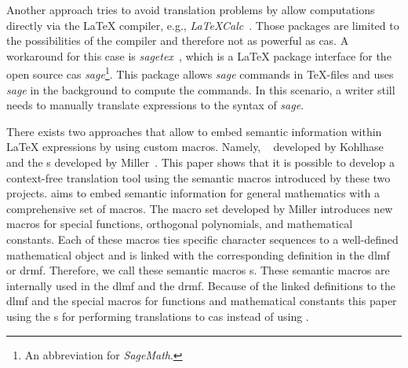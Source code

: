 
Another approach tries to avoid translation problems by allow computations directly via the \LaTeX{} compiler, e.g., \textit{LaTeXCalc}~\parencite{LatexCalc}. Those packages are limited to the possibilities of the compiler and therefore not as powerful as \gls*{cas}. A workaround for this case is \textit{sagetex}~\parencite{Sagetex}, which is a \LaTeX{} package interface for the open source \gls*{cas} \textit{sage}\footnote{An abbreviation for \textit{SageMath}.}. This package allows \textit{sage} commands in \TeX{-}files and uses \textit{sage} in the background to compute the commands. In this scenario, a writer still needs to manually translate expressions to the syntax of \textit{sage}.



There exists two approaches that allow to embed semantic information within \LaTeX{} expressions by using custom macros. Namely, \sTeX{}~\parencite{sTeX} developed by Kohlhase and the \Macro s developed by Miller~\parencite{DLMF:Macros}. This paper shows that it is possible to develop a context-free translation tool using the semantic macros introduced by these two projects. \sTeX{} aims to embed semantic information for general mathematics with a comprehensive set of macros. The macro set developed by Miller introduces new macros for special functions, orthogonal polynomials, and mathematical constants. Each of these macros ties specific character sequences to a well-defined mathematical object and is linked with the corresponding definition in the \gls*{dlmf} or \gls*{drmf}. Therefore, we call these semantic macros \Macro s. These semantic macros are internally used in the \gls*{dlmf} and the \gls*{drmf}. Because of the linked definitions to the \gls*{dlmf} and the special macros for functions and mathematical constants this paper using the \Macro s for performing translations to \gls*{cas} instead of using \sTeX.